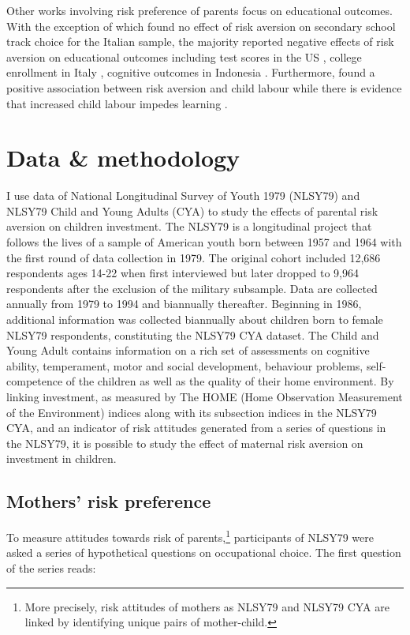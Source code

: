 \documentclass[]{article}
\begin{document}
Other works involving risk preference of parents focus on educational outcomes. With the exception of \citet{leonardi2007parents} which found no effect of risk aversion on secondary school track choice for the Italian sample, the majority reported negative effects of risk aversion on educational outcomes including test scores in the US \citep{brown2012parental}, college enrollment in Italy \citep{checchi2014parents}, cognitive outcomes in Indonesia \citep{hartarto2023parental}. Furthermore, \citet{frempong2021risk} found a positive association between risk aversion and child labour while there is evidence that increased child labour impedes learning \citep{HEADY2003385, bezerra2009impact}.  



\section{Data \& methodology}
I use data of National Longitudinal Survey of Youth 1979 (NLSY79) and NLSY79 Child and Young Adults (CYA) to study the effects of parental risk aversion on children investment. The NLSY79 is a longitudinal project that follows the lives of a sample of American youth born between 1957 and 1964 with the first round of data collection in 1979. The original cohort included 12,686 respondents ages 14-22 when first interviewed but later dropped to 9,964 respondents after the exclusion of the military subsample. Data are collected annually from 1979 to 1994 and biannually thereafter. Beginning in 1986, additional information was collected biannually about children born to female NLSY79 respondents, constituting the NLSY79 CYA dataset. The Child and Young Adult contains information on a rich set of assessments on cognitive ability, temperament, motor and social development, behaviour problems, self-competence of the children as well as the quality of their home environment. By linking investment, as measured by The HOME (Home Observation Measurement of the Environment) indices along with its subsection indices in the NLSY79 CYA, and an indicator of risk attitudes generated from a series of questions in the NLSY79, it is possible to study the effect of maternal risk aversion on investment in children.

\subsection{Mothers' risk preference}
To measure attitudes towards risk of parents,\footnote{More precisely, risk attitudes of mothers as NLSY79 and NLSY79 CYA are linked by identifying unique pairs of mother-child.} participants of NLSY79 were asked a series of hypothetical questions on occupational choice. The first question of the series reads:
\end{document}
